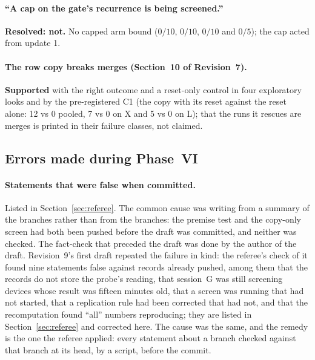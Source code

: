 \documentclass[11pt]{article}
\begin{document}
\paragraph{``A cap on the gate's recurrence is being screened.''} \textbf{Resolved: not.} No capped arm bound ($0/10$, $0/10$, $0/10$ and $0/5$); the cap acted from update 1.

\paragraph{The row copy breaks merges (Section~10 of Revision~7).} \textbf{Supported} with the right outcome and a reset-only control in four exploratory looks and by the pre-registered C1 (the copy with its reset against the reset alone: 12 vs 0 pooled, 7 vs 0 on X and 5 vs 0 on L); that the runs it rescues are merges is printed in their failure classes, not claimed.

\subsection{Errors made during Phase~VI}
\label{sec:errors}

\paragraph{Statements that were false when committed.} Listed in Section~\ref{sec:referee}. The common cause was writing from a summary of the branches rather than from the branches: the premise test and the copy-only screen had both been pushed before the draft was committed, and neither was checked. The fact-check that preceded the draft was done by the author of the draft. Revision~9's first draft repeated the failure in kind: the referee's check of it found nine statements false against records already pushed, among them that the records do not store the probe's reading, that session~G was still screening devices whose result was fifteen minutes old, that a screen was running that had not started, that a replication rule had been corrected that had not, and that the recomputation found ``all'' numbers reproducing; they are listed in Section~\ref{sec:referee} and corrected here. The cause was the same, and the remedy is the one the referee applied: every statement about a branch checked against that branch at its head, by a script, before the commit.
\end{document}
